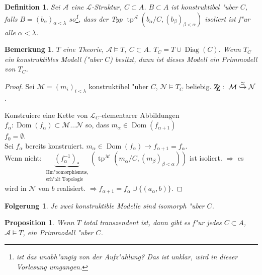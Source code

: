 \documentclass[a4paper,12pt,numbers=noenddot,parskip=full]{scrartcl}
\newcommand{\scrL}{\mathcal{L}}
\newcommand{\scrA}{\mathcal{A}}
\newcommand{\scrM}{\mathcal{M}}
\newcommand{\scrN}{\mathcal{N}}
\newcommand{\zz}{\mathrm{Z\kern-.3em\raise-0.5ex\hbox{Z}}:~}
\DeclareMathOperator{\Diag}{Diag}
\newcommand{\vdig}{\Diag}
\DeclareMathOperator{\dom}{Dom}
\DeclareMathOperator{\typ}{tp}
\theoremstyle{dotless}
\newtheorem{corollary}[theorem]{Folgerung}
\newtheorem{proposition}[theorem]{Proposition}
\newtheorem{definition}[theorem]{Definition}
\newtheorem{remark}[theorem]{Bemerkung}
\begin{document}
\begin{definition}
	Sei $\scrA$ eine $\scrL$-Struktur, $C \subset A$. $B \subset A$ ist \emph{konstruktibel "uber $C$}, falls $B = (b_\alpha)_{\alpha<\lambda}$ so\footnote{ist das unabh"angig von der Aufz"ahlung? Das ist unklar, wird in dieser Vorlesung umgangen.}, dass der Typ $\typ^\scrA\left(b_\alpha / C, (b_\beta)_{\beta<\alpha}\right)$ isoliert ist f"ur alle $\alpha < \lambda$.
\end{definition}
\begin{remark}
	$T$ eine Theorie, $\scrA \models T$, $C \subset A$. $T_C = T \cup \vdig(C)$. Wenn $T_C$ ein konstruktibles Modell ("uber $C$) besitzt, dann ist dieses Modell ein Primmodell von $T_C$.
\end{remark}
\begin{proof}
	Sei $\scrM = (m_i)_{i < \lambda}$ konstruktibel "uber $C$, $\scrN \models T_C$ beliebig. $\zz \scrM \overset{\simeq}{\hookrightarrow} \scrN$.
	
	Konstruiere eine Kette von $\scrL_C$-elementarer Abbildungen $f_\alpha: \dom(f_\alpha) \subset \scrM \dots \scrN$ so, dass $m_\alpha \in \dom(f_{\alpha+1})$\\
	$f_0 = \emptyset$.\\
	Sei $f_\alpha$ bereits konstruiert. $m_\alpha \in \dom(f_\alpha) \longrightarrow f_{\alpha+1} = f_\alpha$.\\
	Wenn nicht: $\underbrace{(f_\alpha^{-1})_*}_{\substack{\text{Hm"oomorphismus,}\\\text{erh"alt Topologie}}} (\typ^\scrM (m_\alpha / C, (m_\beta)_{\beta < \alpha}))$ ist isoliert. $\Longrightarrow$ es wird in $\scrN$ von $b$ realisiert. $\Longrightarrow f_{\alpha+1} = f_\alpha \cup \{(a_\alpha, b) \}$.
\end{proof}
\begin{corollary}
	Je zwei konstruktible Modelle sind isomorph "uber $C$. %
\end{corollary}
\begin{proposition}
	Wenn $T$ total transzendent ist, dann gibt es f"ur jedes $C \subset A$, $\scrA \models T$, ein Primmodell "uber $C$.
\end{proposition}
\end{document}
